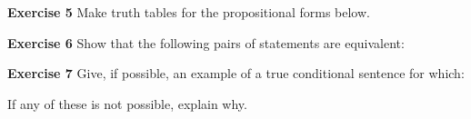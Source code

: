 \documentclass[12pt,oneside]{exam}
\newenvironment{exercise}[1]{\vspace{.1in}\noindent\textbf{Exercise #1 \hspace{.05em}}}{}
\begin{document}
\begin{exercise}{5}
Make truth tables for the propositional forms below.
\end{exercise}

\begin{exercise}{6}
Show that the following pairs of statements are equivalent:
\end{exercise}

\begin{exercise}{7}
Give, if possible, an example of a true conditional sentence for which:
If any of these is not possible, explain why. 
\end{exercise}
\end{document}
